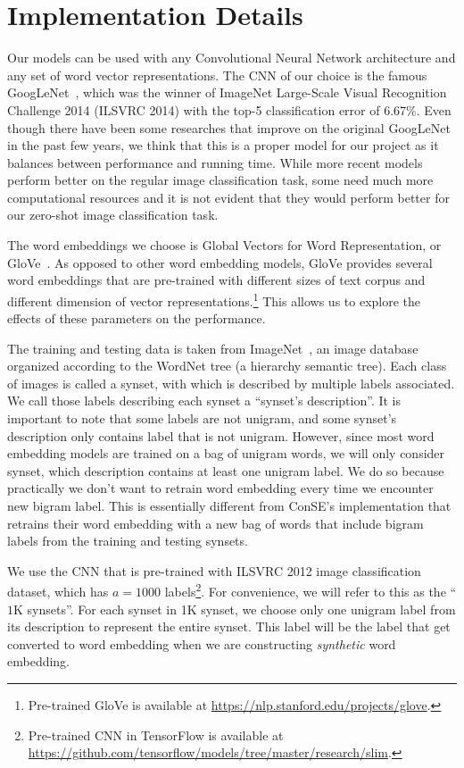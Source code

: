 \documentclass[11pt,letterpaper]{article}
\begin{document}
\section{Implementation Details}
Our models can be used with any Convolutional Neural Network architecture and any set of word vector representations. The CNN of our choice is the famous GoogLeNet~\cite{inceptionv1}, which was the winner of ImageNet Large-Scale Visual Recognition Challenge 2014 (ILSVRC 2014) with the top-5 classification error of 6.67\%. Even though there have been some researches that improve on the original GoogLeNet in the past few years, we think that this is a proper model for our project as it balances between performance and running time. While more recent models perform better on the regular image classification task, some need much more computational resources and it is not evident that they would perform better for our zero-shot image classification task. 

The word embeddings we choose is Global Vectors for Word Representation, or GloVe~\cite{pennington2014glove}. As opposed to other word embedding models, GloVe provides several word embeddings that are pre-trained with different sizes of text corpus and different dimension of vector representations.\footnote{Pre-trained GloVe is available at \url{https://nlp.stanford.edu/projects/glove}.} This allows us to explore the effects of these parameters on the performance.

The training and testing data is taken from ImageNet~\cite{imagenet_cvpr09}, an image database organized according to the WordNet tree (a hierarchy semantic tree). Each class of images is called a synset, with which is described by multiple labels associated. We call those labels describing each synset a ``synset's description''. It is important to note that some labels are not unigram, and some synset's description only contains label that is not unigram. However, since most word embedding models are trained on a bag of unigram words, we will only consider synset, which description contains at least one unigram label. We do so because practically we don't want to retrain word embedding every time we encounter new bigram label. This is essentially different from ConSE's implementation that retrains their word embedding with a new bag of words that include bigram labels from the training and testing synsets.

We use the CNN that is pre-trained with ILSVRC 2012 image classification dataset, which has $a = 1000$ labels\footnote{Pre-trained CNN in TensorFlow is available at \url{https://github.com/tensorflow/models/tree/master/research/slim}.}. For convenience, we will refer to this as the ``$1$K synsets''. For each synset in 1K synset, we choose only one unigram label from its description to represent the entire synset. This label will be the label that get converted to word embedding when we are constructing {\em synthetic} word embedding.
\end{document}
